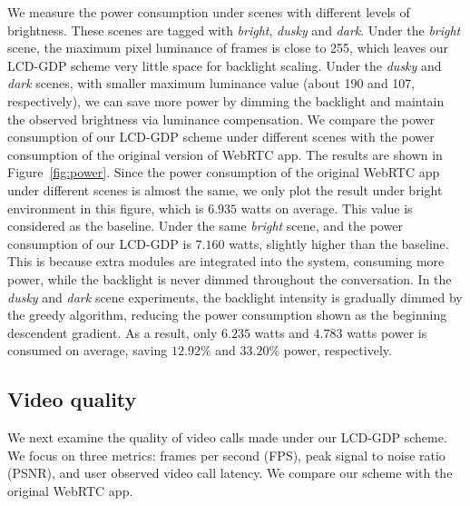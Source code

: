 We measure the power consumption under scenes with different levels of
brightness.  These scenes are tagged with {\it bright}, {\it dusky}
and {\it dark}.  Under the {\it bright} scene, the maximum pixel
luminance of frames is close to 255, which leaves our LCD-GDP scheme
very little space for backlight scaling.  Under the {\it dusky} and
{\it dark} scenes, with smaller maximum luminance value (about 190 and
107, respectively), we can save more power by dimming the backlight
and maintain the observed brightness via luminance compensation.  We
compare the power consumption of our LCD-GDP scheme under different
scenes with the power consumption of the original version of WebRTC
app.  The results are shown in Figure~\ref{fig:power}.  Since the
power consumption of the original WebRTC app under different scenes is
almost the same, we only plot the result under bright environment in
this figure, which is $6.935$ watts on average.  This value is
considered as the baseline.  Under the same {\it bright} scene, and
the power consumption of our LCD-GDP is $7.160$ watts, slightly higher
than the baseline.  This is because extra modules are integrated into
the system, consuming more power, while the backlight is never dimmed
throughout the conversation.  In the {\it dusky} and {\it dark} scene
experiments, the backlight intensity is gradually dimmed by the greedy
algorithm, reducing the power consumption shown as the beginning
descendent gradient.  As a result, only $6.235$ watts and $4.783$
watts power is consumed on average, saving $12.92\%$ and $33.20\%$
power, respectively.
%

\subsection{Video quality}

We next examine the quality of video calls made under our LCD-GDP
scheme.  We focus on three metrics: frames per second (FPS), peak
signal to noise ratio (PSNR), and user observed video call latency.
We compare our scheme with the original WebRTC app.

